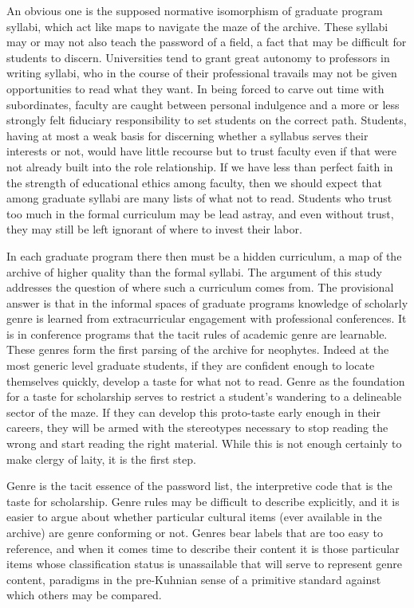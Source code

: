 \documentclass[]{book}
\theoremstyle{definition}
\theoremstyle{definition}
\theoremstyle{definition}
\theoremstyle{remark}
\begin{document}
An obvious one is the supposed normative isomorphism of graduate program
syllabi, which act like maps to navigate the maze of the archive. These
syllabi may or may not also teach the password of a field, a fact that
may be difficult for students to discern. Universities tend to grant
great autonomy to professors in writing syllabi, who in the course of
their professional travails may not be given opportunities to read what
they want. In being forced to carve out time with subordinates, faculty
are caught between personal indulgence and a more or less strongly felt
fiduciary responsibility to set students on the correct path. Students,
having at most a weak basis for discerning whether a syllabus serves
their interests or not, would have little recourse but to trust faculty
even if that were not already built into the role relationship. If we
have less than perfect faith in the strength of educational ethics among
faculty, then we should expect that among graduate syllabi are many
lists of what not to read. Students who trust too much in the formal
curriculum may be lead astray, and even without trust, they may still be
left ignorant of where to invest their labor.

In each graduate program there then must be a hidden curriculum, a map
of the archive of higher quality than the formal syllabi. The argument
of this study addresses the question of where such a curriculum comes
from. The provisional answer is that in the informal spaces of graduate
programs knowledge of scholarly genre is learned from extracurricular
engagement with professional conferences. It is in conference programs
that the tacit rules of academic genre are learnable. These genres form
the first parsing of the archive for neophytes. Indeed at the most
generic level graduate students, if they are confident enough to locate
themselves quickly, develop a taste for what not to read. Genre as the
foundation for a taste for scholarship serves to restrict a student's
wandering to a delineable sector of the maze. If they can develop this
proto-taste early enough in their careers, they will be armed with the
stereotypes necessary to stop reading the wrong and start reading the
right material. While this is not enough certainly to make clergy of
laity, it is the first step.

Genre is the tacit essence of the password list, the interpretive code
that is the taste for scholarship. Genre rules may be difficult to
describe explicitly, and it is easier to argue about whether particular
cultural items (ever available in the archive) are genre conforming or
not. Genres bear labels that are too easy to reference, and when it
comes time to describe their content it is those particular items whose
classification status is unassailable that will serve to represent genre
content, paradigms in the pre-Kuhnian sense of a primitive standard
against which others may be compared.
\end{document}
